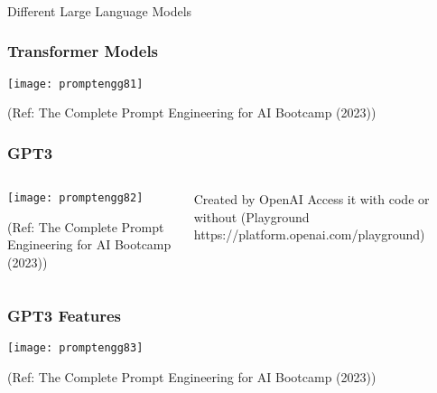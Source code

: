 \begin{frame}[fragile]\frametitle{}
\begin{center}
{\Large Different Large Language Models}

\end{center}
\end{frame}

\begin{frame}[fragile]\frametitle{Transformer Models}



		\begin{center}
		\texttt{[image: promptengg81]}

		{\tiny (Ref: The Complete Prompt Engineering for AI Bootcamp (2023))}
		\end{center}	

\end{frame}



\begin{frame}[fragile]\frametitle{GPT3}


\begin{columns}
    \begin{column}[T]{0.6\linewidth}
		\begin{center}
		\texttt{[image: promptengg82]}

		{\tiny (Ref: The Complete Prompt Engineering for AI Bootcamp (2023))}
		\end{center}	
    \end{column}
    \begin{column}[T]{0.4\linewidth}
		Created by OpenAI
		Access it with code or without (Playground https://platform.openai.com/playground)
    \end{column}
  \end{columns}
\end{frame}

\begin{frame}[fragile]\frametitle{GPT3 Features}


		\begin{center}
		\texttt{[image: promptengg83]}

		{\tiny (Ref: The Complete Prompt Engineering for AI Bootcamp (2023))}
		\end{center}	

\end{frame}


